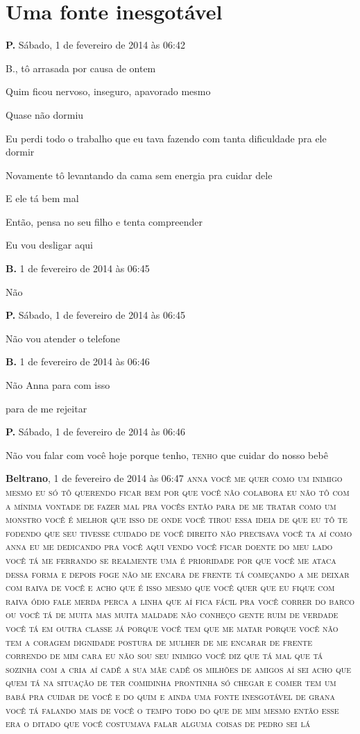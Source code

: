 {{\chapter{Uma fonte inesgotável}\label{uma-fonte-inesgotuxe1vel}

\textbf{P.} Sábado, 1 de fevereiro de 2014 às 06:42

B., tô arrasada por causa de ontem

Quim ficou nervoso, inseguro, apavorado mesmo

Quase não dormiu

Eu perdi todo o trabalho que eu tava fazendo com tanta dificuldade pra
ele dormir

Novamente tô levantando da cama sem energia pra cuidar dele

E ele tá bem mal

Então, pensa no seu filho e tenta compreender

Eu vou desligar aqui

\textbf{B.} 1 de fevereiro de 2014 às 06:45

Não

\textbf{P.} Sábado, 1 de fevereiro de 2014 às 06:45

Não vou atender o telefone

\textbf{B.} 1 de fevereiro de 2014 às 06:46

Não Anna para com isso

para de me rejeitar

\textbf{P.} Sábado, 1 de fevereiro de 2014 às 06:46

Não vou falar com você hoje porque tenho, \textsc{tenho} que cuidar do
nosso bebê

\textbf{Beltrano}, 1 de fevereiro de 2014 às 06:47 \textsc{anna você me
quer como um inimigo mesmo eu só tô querendo ficar bem por que você não
colabora eu não tô com a mínima vontade de fazer mal pra vocês então
para de me tratar como um monstro você é melhor que isso de onde você
tirou essa ideia de que eu tô te fodendo que seu tivesse cuidado de você
direito não precisava você ta aí como anna eu me dedicando pra você aqui
vendo você ficar doente do meu lado você tá me ferrando se realmente uma
é prioridade por que você me ataca dessa forma e depois foge não me
encara de frente tá começando a me deixar com raiva de você e acho que é
isso mesmo que você quer que eu fique com raiva ódio fale merda perca a
linha que aí fica fácil pra você correr do barco ou você tá de muita mas
muita maldade não conheço gente ruim de verdade você tá em outra classe
já porque você tem que me matar porque você não tem a coragem dignidade
postura de mulher de me encarar de frente correndo de mim cara eu não
sou seu inimigo você diz que tá mal que tá sozinha com a cria aí cadê a
sua mãe cadê os milhões de amigos aí sei acho que quem tá na situação de
ter comidinha prontinha só chegar e comer tem um babá pra cuidar de você
e do quim e ainda uma fonte inesgotável de grana você tá falando mais de
você o tempo todo do que de mim mesmo então esse era o ditado que você
costumava falar alguma coisas de pedro sei lá}

}}
